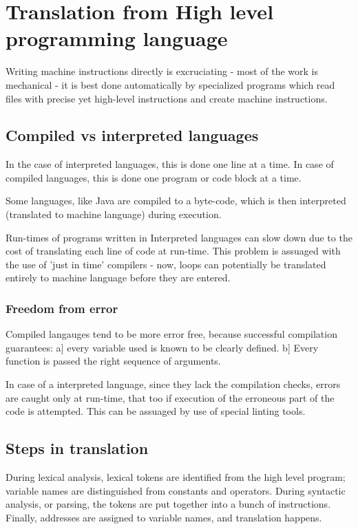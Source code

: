 \documentclass[oneside, article]{memoir}
\begin{document}
\section{Translation from High level programming language}
Writing machine instructions directly is excruciating - most of the work is mechanical - it is best done automatically by specialized programs which read files with precise yet high-level instructions and create machine instructions.

\subsection{Compiled vs interpreted languages}
In the case of interpreted languages, this is done one line at a time. In case of compiled languages, this is done one program or code block at a time.

Some languages, like Java are compiled to a byte-code, which is then interpreted (translated to machine language) during execution.

Run-times of programs written in Interpreted languages can slow down due to the cost of translating each line of code at run-time. This problem is assuaged with the use of 'just in time' compilers - now, loops can potentially be translated entirely to machine language before they are entered.

\subsubsection{Freedom from error}
Compiled langauges tend to be more error free, because successful compilation guarantees: a] every variable used is known  to be clearly defined. b] Every function is passed the right sequence of arguments.

In case of a interpreted language, since they lack the compilation checks, errors are caught only at run-time, that too if execution of the erroneous part of the code is attempted. This can be assuaged by use of special linting tools.

\subsection{Steps in translation}
During lexical analysis, lexical tokens are identified from the high level program; variable names are distinguished from constants and operators. During syntactic analysis, or parsing, the tokens are put together into a bunch of instructions. Finally, addresses are assigned to variable names, and translation happens.
\end{document}
